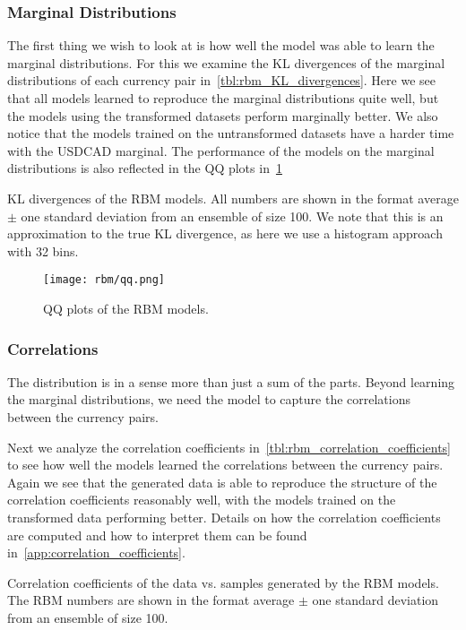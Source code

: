 \subsubsection{Marginal Distributions}
The first thing we wish to look at is how well the model was able to learn the marginal distributions.
For this we examine the KL divergences of the marginal distributions of each currency pair in~\cref{tbl:rbm_KL_divergences}.
Here we see that all models learned to reproduce the marginal distributions quite well, but the models using the transformed datasets perform marginally better.
We also notice that the models trained on the untransformed datasets have a harder time with the USDCAD marginal.
The performance of the models on the marginal distributions is also reflected in the QQ plots in~\cref{fig:rbm_qq_plots}
\begin{table}[!htb]
    \centering
    \begin{adjustbox}{max width=\textwidth}
        
    \end{adjustbox}
    \caption{KL divergences of the RBM models. All numbers are shown in the format average \(\pm\) one standard deviation from an ensemble of size 100. We note that this is an approximation to the true KL divergence, as here we use a histogram approach with 32 bins.}
    \label{tbl:rbm_KL_divergences}
\end{table}
\begin{figure}[!htb]
    \begin{center}
        \texttt{[image: rbm/qq.png]}
    \end{center}
    \caption{QQ plots of the RBM models.}
    \label{fig:rbm_qq_plots}
\end{figure}

\subsubsection{Correlations}
The distribution is in a sense more than just a sum of the parts.
Beyond learning the marginal distributions, we need the model to capture the correlations between the currency pairs.

Next we analyze the correlation coefficients in~\cref{tbl:rbm_correlation_coefficients} to see how well the models learned the correlations between the currency pairs.
Again we see that the generated data is able to reproduce the structure of the correlation coefficients reasonably well, with the models trained on the transformed data performing better.
Details on how the correlation coefficients are computed and how to interpret them can be found in~\cref{app:correlation_coefficients}.
\begin{table}[!htb]
    \centering
    \begin{adjustbox}{max width=\textwidth}
        
    \end{adjustbox}
    \caption{Correlation coefficients of the data vs. samples generated by the RBM models. The RBM numbers are shown in the format average \(\pm\) one standard deviation from an ensemble of size 100.}
    \label{tbl:rbm_correlation_coefficients}
\end{table}

